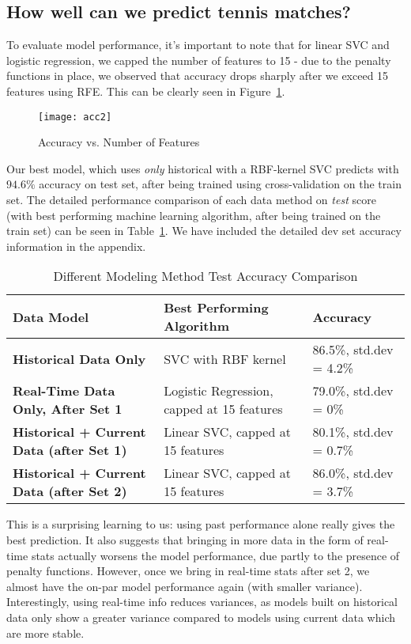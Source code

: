 \documentclass[paper=a4, fontsize=10pt]{scrartcl} %
\numberwithin{equation}{section} %
\numberwithin{figure}{section} %
\numberwithin{table}{section} %
\begin{document}
\subsection{How well can we predict tennis matches?}
To evaluate model performance, it's important to note that for linear SVC and logistic regression, we capped the number of features to 15 - due to the penalty functions in place, we observed that accuracy drops sharply after we exceed 15 features using RFE. This can be clearly seen in Figure~\ref{fig:rfe}. 
\begin{figure}[h]
\caption{Accuracy vs. Number of Features}
  \label{fig:rfe}
  \centering
    \texttt{[image: acc2]}
\end{figure}
Our best model, which uses \textit{only} historical with a RBF-kernel SVC predicts with $94.6\%$ accuracy on test set, after being trained using cross-validation on the train set. The detailed performance comparison of each data method on \textit{test} score (with best performing machine learning algorithm, after being trained on the train set) can be seen in Table~\ref{tab:m1}. We have included the detailed dev set accuracy information in the appendix. 
\begin{table}[h]
\caption{Different Modeling Method Test Accuracy Comparison}
\label{tab:m1}
\begin{tabular}{ p{2.5cm} | p{2.5cm} | p{2cm}}
    \hline
    \textbf{Data Model} & \textbf{Best Performing Algorithm} & \textbf{Accuracy}  \\ \hline
   \textbf{Historical Data Only} &  SVC with RBF kernel & 86.5\%, std.dev = 4.2\%  \\ \hline
   \textbf{Real-Time Data Only, After Set 1} & Logistic Regression, capped at 15 features & 79.0\%, std.dev = 0\%  \\ \hline
   \textbf{Historical + Current Data (after Set 1)} &  Linear SVC, capped at 15 features & 80.1\%, std.dev = 0.7\%  \\ \hline
   \textbf{Historical + Current Data (after Set 2)} &  Linear SVC, capped at 15 features & 86.0\%, std.dev = 3.7\% \\ \hline
\end{tabular}
\end{table}
This is a surprising learning to us: using past performance alone really gives the best prediction. It also suggests that bringing in more data in the form of real-time stats actually worsens the model performance, due partly to the presence of penalty functions. However, once we bring in real-time stats after set 2, we almost have the on-par model performance again (with smaller variance). Interestingly, using real-time info reduces variances, as models built on historical data only show a greater variance compared to models using current data which are  more stable. 
\end{document}
